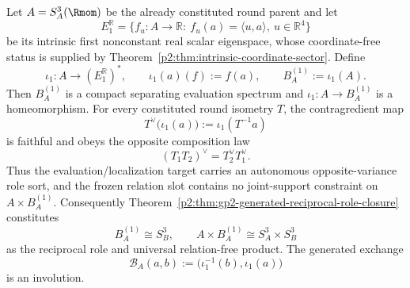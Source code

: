 \documentclass[12pt,a4paper]{article}
\begin{document}
\begin{theorem}
\label{p2c:thm:coordinate-generated-reciprocal-role}
Let \(A=S^3_A(\Rmom)\) be the already constituted round parent and let
\[
 E_1^{\mathbb R}
 =\{f_u:A\to\mathbb R:\ f_u(a)=\langle u,a\rangle,\ u\in\mathbb R^4\}
\]
be its intrinsic first nonconstant real scalar eigenspace, whose
coordinate-free status is supplied by
Theorem~\ref{p2:thm:intrinsic-coordinate-sector}.  Define
\[
 \iota_1:A\longrightarrow(E_1^{\mathbb R})^*,
 \qquad
 \iota_1(a)(f):=f(a),
 \qquad
 B_A^{(1)}:=\iota_1(A).
\]
Then \(B_A^{(1)}\) is a compact separating evaluation spectrum and
\(\iota_1:A\to B_A^{(1)}\) is a homeomorphism.  For every constituted round
isometry \(T\), the contragredient map
\[
 T^\vee\bigl(\iota_1(a)\bigr):=\iota_1(T^{-1}a)
\]
is faithful and obeys the opposite composition law
\[
        (T_1T_2)^\vee=T_2^\vee T_1^\vee.
\]
Thus the evaluation/localization target carries an autonomous
opposite-variance role sort, and the frozen relation slot contains no
joint-support constraint on \(A\times B_A^{(1)}\).  Consequently
Theorem~\ref{p2:thm:gp2-generated-reciprocal-role-closure} constitutes
\[
        B_A^{(1)}\cong S^3_B,
        \qquad
        A\times B_A^{(1)}\cong S^3_A\times S^3_B
\]
as the reciprocal role and universal relation-free product.  The generated
exchange
\[
 \mathcal B_A(a,b)
 :=\bigl(\iota_1^{-1}(b),\iota_1(a)\bigr)
\]
is an involution.
\end{theorem}
\end{document}
